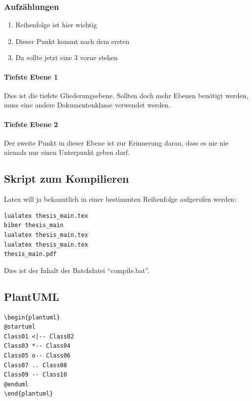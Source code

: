 \subsubsection{Aufzählungen}
\begin{enumerate}
\item Reihenfolge ist hier wichtig
\item Dieser Punkt kommt nach dem ersten
\item Da sollte jetzt eine 3 vorne stehen
\end{enumerate}

\paragraph{Tiefste Ebene 1}
Dies ist die tiefste Gliederungsebene. Sollten doch mehr Ebenen benötigt werden, muss eine andere Dokumentenklasse verwendet werden.

\paragraph{Tiefste Ebene 2}
Der zweite Punkt in dieser Ebene ist zur Erinnerung daran, dass es nie nie niemals nur einen Unterpunkt geben darf.

\subsection{Skript zum Kompilieren}
Latex will ja bekanntlich in einer bestimmten Reihenfolge aufgerufen werden:
\begin{lstlisting}
lualatex thesis_main.tex
biber thesis_main
lualatex thesis_main.tex
lualatex thesis_main.tex
thesis_main.pdf
\end{lstlisting}

Dies ist der Inhalt der Batchdatei \enquote{compile.bat}.

\subsection{PlantUML}

\begin{lstlisting}
\begin{plantuml}
@startuml
Class01 <|-- Class02
Class03 *-- Class04
Class05 o-- Class06
Class07 .. Class08
Class09 -- Class10
@enduml
\end{plantuml}
\end{lstlisting}